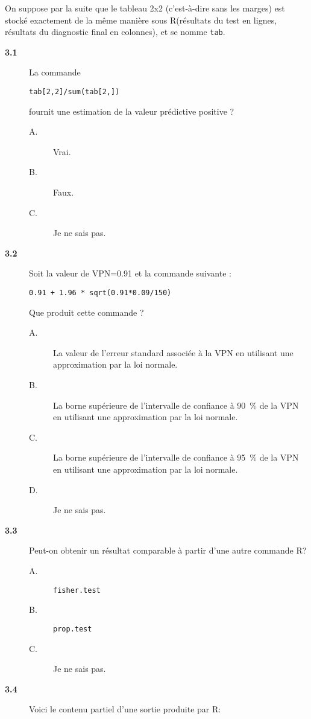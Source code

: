 \documentclass[11pt]{report}
\theoremstyle{definition}
\newcommand{\R}{\textsf{R}\xspace}
\begin{document}
On suppose par la suite que le tableau 2x2 (c'est-à-dire sans les marges)
est stocké exactement de la même manière sous \R (résultats du test en
lignes, résultats du diagnostic final en colonnes), et se nomme
\texttt{tab}.
\begin{description}
\item[\bf 3.1]  La commande 
\begin{verbatim}
tab[2,2]/sum(tab[2,])
\end{verbatim}
  fournit une estimation de la valeur prédictive positive ? 
  \begin{description}
  \item[A.] Vrai.
  \item[B.] Faux.
  \item[C.] Je ne sais pas.
  \end{description}  
\item[\bf 3.2]  Soit la valeur de VPN=0.91 et la
  commande suivante :
\begin{verbatim}
0.91 + 1.96 * sqrt(0.91*0.09/150)
\end{verbatim}
  Que produit cette commande ? 
  \begin{description}
  \item[A.] La valeur de l'erreur standard associée à la VPN en utilisant
    une approximation par la loi normale.
  \item[B.] La borne supérieure de l'intervalle de confiance à 90~\% de la
    VPN en utilisant une approximation par la loi normale.
  \item[C.] La borne supérieure de l'intervalle de confiance à 95~\% de la
    VPN en utilisant une approximation par la loi normale.
  \item[D.] Je ne sais pas.
  \end{description}
\item[\bf 3.3]  Peut-on obtenir un résultat
  comparable à partir d'une autre commande \R ?
  \begin{description}
  \item[A.] \verb|fisher.test|
  \item[B.] \verb|prop.test|
  \item[C.] Je ne sais pas.
  \end{description}
\item[\bf 3.4]  Voici le contenu partiel d'une
  sortie produite par \R :
\begin{verbatim}

\end{verbatim}
\end{description}
\end{document}
